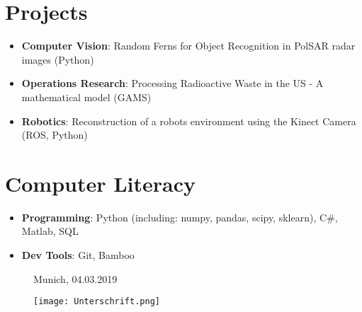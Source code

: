 \documentclass[letterpaper,11pt]{article}
\newcommand{\resumeItem}[2]{
  \item\small{
    {#1}{:#2 \vspace{-2pt}}
  }
}
\newcommand{\resumeSubItem}[2]{\resumeItem{#1}{#2}\vspace{-4pt}}
\newcommand{\resumeSubHeadingListStart}{\begin{itemize}[leftmargin=*]}
\newcommand{\resumeSubHeadingListEnd}{\end{itemize}}
\begin{document}
\section{Projects}
  \resumeSubHeadingListStart
  	\item{\textbf{Computer Vision}: Random Ferns for Object Recognition in PolSAR radar images (Python)}
  	\vspace{-0.1in}
    \item{\textbf{Operations Research}: Processing Radioactive Waste in the US - A mathematical model (GAMS)}   
    \vspace{-0.1in} 	
	\item{\textbf{Robotics}: Reconstruction of a robots environment using the Kinect Camera (ROS, Python)}
	\vspace{-0.1in}
\resumeSubHeadingListEnd

\section{Computer Literacy}
\resumeSubHeadingListStart
\item{\textbf{Programming}: Python (including: numpy, pandas, scipy, sklearn), C\#, Matlab, SQL}
\vspace{-0.1in}
\item{\textbf{Dev Tools}: Git, Bamboo}   
\vspace{-0.1in}
\resumeSubHeadingListEnd







\vspace{0.5pt}		
\begin{figure}[h]
	\centering	
	\begin{minipage}{0.49\textwidth}
		Munich, 04.03.2019
				
	\end{minipage}		
	\begin{minipage}{0.49\textwidth}
		\raggedright
		\texttt{[image: Unterschrift.png]}
	\end{minipage}	
\end{figure}

\end{document}

